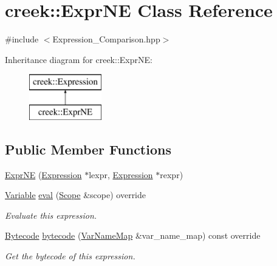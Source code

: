 \hypertarget{classcreek_1_1_expr_n_e}{}\section{creek\+:\+:Expr\+NE Class Reference}
\label{classcreek_1_1_expr_n_e}


{\ttfamily \#include $<$Expression\+\_\+\+Comparison.\+hpp$>$}

Inheritance diagram for creek\+:\+:Expr\+NE\+:\begin{figure}[H]
\begin{center}
\leavevmode
\includegraphics[height=2.000000cm]{classcreek_1_1_expr_n_e}
\end{center}
\end{figure}
\subsection*{Public Member Functions}
\begin{DoxyCompactItemize}
\item 
\hyperlink{classcreek_1_1_expr_n_e_a08193afbfc6bd8b90eeda588b5cbd1e9}{Expr\+NE} (\hyperlink{classcreek_1_1_expression}{Expression} $\ast$lexpr, \hyperlink{classcreek_1_1_expression}{Expression} $\ast$rexpr)
\item 
\hyperlink{classcreek_1_1_variable}{Variable} \hyperlink{classcreek_1_1_expr_n_e_ad0fc128b6060f2e9231fea49126f738f}{eval} (\hyperlink{classcreek_1_1_scope}{Scope} \&scope) override
\begin{DoxyCompactList}\small\item\em Evaluate this expression. \end{DoxyCompactList}\item 
\hyperlink{classcreek_1_1_bytecode}{Bytecode} \hyperlink{classcreek_1_1_expr_n_e_a82879408cd706683591c6e500c8113e3}{bytecode} (\hyperlink{classcreek_1_1_var_name_map}{Var\+Name\+Map} \&var\+\_\+name\+\_\+map) const  override\hypertarget{classcreek_1_1_expr_n_e_a82879408cd706683591c6e500c8113e3}{}\label{classcreek_1_1_expr_n_e_a82879408cd706683591c6e500c8113e3}

\begin{DoxyCompactList}\small\item\em Get the bytecode of this expression. \end{DoxyCompactList}\end{DoxyCompactItemize}


